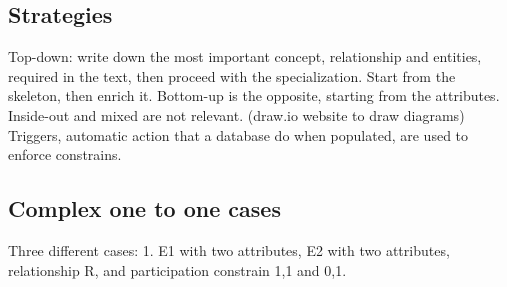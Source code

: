 \documentclass[11pt]{report}
\theoremstyle{definition}
\theoremstyle{remark}
\begin{document}
\subsection*{Strategies}
Top-down: write down the most important concept, relationship and entities, required in the text, then proceed with the specialization. Start from the skeleton, then enrich it.
Bottom-up is the opposite, starting from the attributes.  
Inside-out and mixed are not relevant.
(draw.io website to draw diagrams)
Triggers, automatic action that a database do when populated, are  used to enforce constrains. 
\subsection*{Complex one to one cases}
Three different cases:
1. E1 with two attributes, E2 with two attributes, relationship R, and participation constrain 1,1 and 0,1. 
\end{document}
